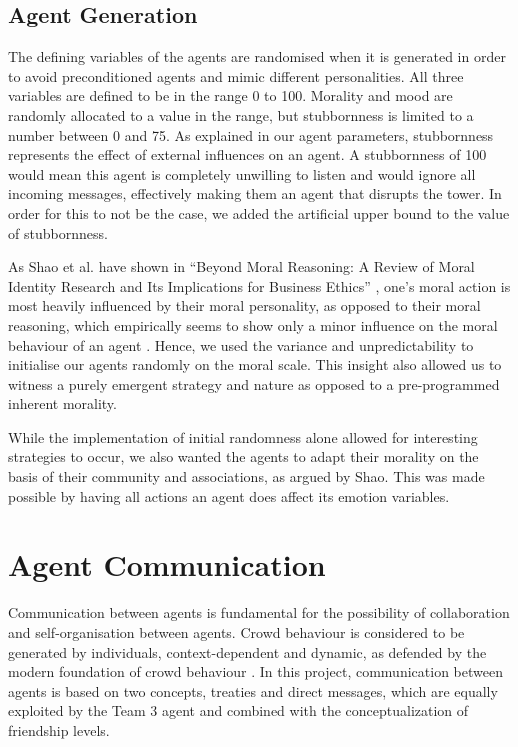 \subsection{Agent Generation}
The defining variables of the agents are randomised when it is generated in order to avoid preconditioned agents and mimic different personalities. All three variables are defined to be in the range 0 to 100. Morality and mood are randomly allocated to a value in the range, but stubbornness is limited to a number between 0 and 75. As explained in our agent parameters, stubbornness represents the effect of external influences on an agent. A stubbornness of 100 would mean this agent is completely unwilling to listen and would ignore all incoming messages, effectively making them an agent that disrupts the tower. In order for this to not be the case, we added the artificial upper bound to the value of stubbornness.\par 
As Shao et al. have shown in “Beyond Moral Reasoning: A Review of Moral Identity Research and Its Implications for Business Ethics” \cite{shao_aquino_freeman_2008}, one’s moral action is most heavily influenced by their moral personality, as opposed to their moral reasoning, which empirically seems to show only a minor influence on the moral behaviour of an agent \cite{blasi_1983}. Hence, we used the variance and unpredictability to initialise our agents randomly on the moral scale. This insight also allowed us to witness a purely emergent strategy and nature as opposed to a pre-programmed inherent morality.\par 
While the implementation of initial randomness alone allowed for interesting strategies to occur, we also wanted the agents to adapt their morality on the basis of their community and associations, as argued by Shao. This was made possible by having all actions an agent does affect its emotion variables. \par 

\section{Agent Communication}\label{sec:agent_communication}
Communication between agents is fundamental for the possibility of collaboration and self-organisation between agents. Crowd behaviour is considered to be generated by individuals, context-dependent and dynamic, as defended by the modern foundation of crowd behaviour \cite{0d9bc1ee81234780b2bb6ecd02762d56}. In this project, communication between agents is based on two concepts, treaties and direct messages, which are equally exploited by the Team 3 agent and combined with the conceptualization of friendship levels. 

